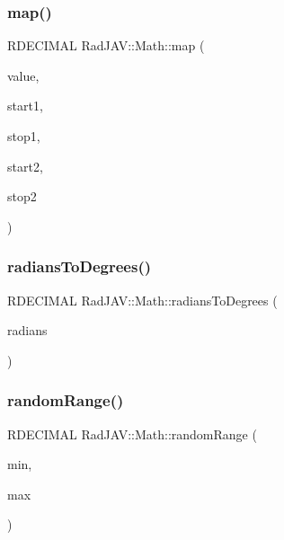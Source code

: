 \subsubsection{\texorpdfstring{map()}{map()}}
{\footnotesize\ttfamily R\+D\+E\+C\+I\+M\+AL Rad\+J\+A\+V\+::\+Math\+::map (\begin{DoxyParamCaption}\item[{R\+D\+E\+C\+I\+M\+AL}]{value,  }\item[{R\+D\+E\+C\+I\+M\+AL}]{start1,  }\item[{R\+D\+E\+C\+I\+M\+AL}]{stop1,  }\item[{R\+D\+E\+C\+I\+M\+AL}]{start2,  }\item[{R\+D\+E\+C\+I\+M\+AL}]{stop2 }\end{DoxyParamCaption})\hspace{0.3cm}{\ttfamily [static]}}

\mbox{\label{class_rad_j_a_v_1_1_math_acfbf88ec92e268dccb33749dc9c70d3b}} 
\subsubsection{\texorpdfstring{radians\+To\+Degrees()}{radiansToDegrees()}}
{\footnotesize\ttfamily R\+D\+E\+C\+I\+M\+AL Rad\+J\+A\+V\+::\+Math\+::radians\+To\+Degrees (\begin{DoxyParamCaption}\item[{R\+D\+E\+C\+I\+M\+AL}]{radians }\end{DoxyParamCaption})\hspace{0.3cm}{\ttfamily [static]}}

\mbox{\label{class_rad_j_a_v_1_1_math_a708fd5648a9d1dd59b6dddfab3e6e10d}} 
\subsubsection{\texorpdfstring{random\+Range()}{randomRange()}}
{\footnotesize\ttfamily R\+D\+E\+C\+I\+M\+AL Rad\+J\+A\+V\+::\+Math\+::random\+Range (\begin{DoxyParamCaption}\item[{R\+D\+E\+C\+I\+M\+AL}]{min,  }\item[{R\+D\+E\+C\+I\+M\+AL}]{max }\end{DoxyParamCaption})\hspace{0.3cm}{\ttfamily [static]}}

